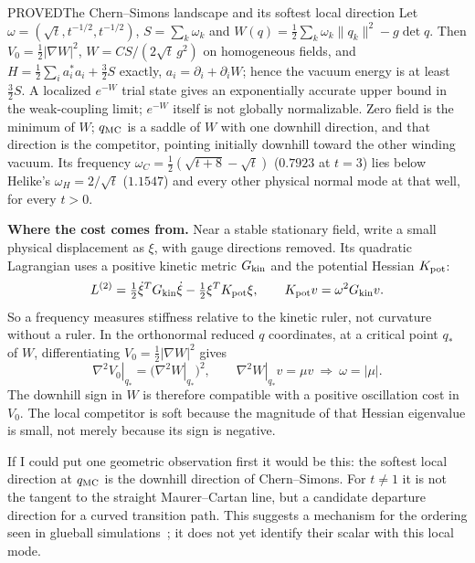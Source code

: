 \begin{claim}{PROVED}{The Chern--Simons landscape and its softest local direction}\label{b:susy}
Let $\omega=(\sqrt t,t^{-1/2},t^{-1/2})$, $S=\sum_k\omega_k$ and $W(q)=\tfrac12\sum_k\omega_k\|q_k\|^2-g\det q$. Then
$V_0=\tfrac12|\nabla W|^2$, $W=CS/(2\sqrt t\,g^2)$ on homogeneous fields, and $H=\tfrac12\sum_ia_i^*a_i+\tfrac32S$
exactly, $a_i=\partial_i+\partial_iW$; hence the vacuum energy is at least $\tfrac32S$. A localized $e^{-W}$ trial
state gives an exponentially accurate upper bound in the weak-coupling limit; $e^{-W}$ itself is not globally normalizable. Zero field is
the minimum of $W$; $q_{\rm MC}$ is a saddle of $W$ with one downhill direction, and that direction is the competitor,
pointing initially downhill toward the other winding vacuum. Its frequency
$\omega_C=\tfrac12(\sqrt{t+8}-\sqrt t)$ ($0.7923$ at $t=3$) lies below Helike's $\omega_H=2/\sqrt t$ ($1.1547$) and every
other physical normal mode at that well, for every $t>0$.
\end{claim}

\textbf{Where the cost comes from.} Near a stable stationary field, write a small physical displacement as $\xi$,
with gauge directions removed. Its quadratic Lagrangian uses a positive kinetic metric $G_{\rm kin}$ and the
potential Hessian $K_{\rm pot}$:
\begin{equation}\label{eq:oscillation}
 L^{(2)}=\tfrac12\dot\xi^T G_{\rm kin}\dot\xi-\tfrac12\xi^T K_{\rm pot}\xi,
 \qquad K_{\rm pot}v=\omega^2G_{\rm kin}v.
\end{equation}
So a frequency measures stiffness relative to the kinetic ruler, not curvature without a ruler. In the orthonormal
reduced $q$ coordinates, at a critical point $q_*$ of $W$, differentiating $V_0=\tfrac12|\nabla W|^2$ gives
\begin{equation}\label{eq:hessian}
 \left.\nabla^2V_0\right|_{q_*}=\bigl(\left.\nabla^2W\right|_{q_*}\bigr)^2,
 \qquad \left.\nabla^2W\right|_{q_*}v=\mu v\ \Longrightarrow\ \omega=|\mu|.
\end{equation}
The downhill sign in $W$ is therefore compatible with a positive oscillation cost in $V_0$. The local competitor
is soft because the magnitude of that Hessian eigenvalue is small, not merely because its sign is negative.

If I could put one geometric observation first it would be this: the softest local direction at $q_{\rm MC}$ is the
downhill direction of Chern--Simons. For $t\ne1$ it is not the tangent to the straight Maurer--Cartan line, but a
candidate departure direction for a curved transition path. This suggests a mechanism for the ordering seen in
glueball simulations~\cite{MorningstarPeardon99}; it does not yet identify their scalar with this local mode.

